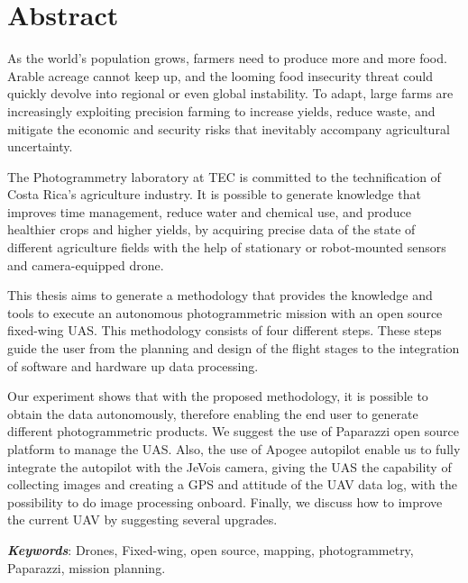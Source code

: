 \section*{Abstract}
As the world’s population grows, farmers need to produce more and more food. Arable acreage cannot keep up, and the looming food insecurity threat could quickly devolve into regional or even global instability. To adapt, large farms are increasingly exploiting precision farming to increase yields, reduce waste, and mitigate the economic and security risks that inevitably accompany agricultural uncertainty.

The  Photogrammetry laboratory at TEC is committed to the technification of  Costa Rica's agriculture industry. It is possible to generate knowledge that improves time management, reduce water and chemical use, and produce healthier crops and higher yields, by acquiring precise data of the state of different agriculture fields with the help of stationary or robot-mounted sensors and camera-equipped drone.


This thesis aims to generate a methodology that provides the knowledge and tools to execute an autonomous photogrammetric mission with an open source fixed-wing UAS.  This methodology consists of four different steps. These steps guide the user from the planning and design of the flight stages to the integration of software and hardware up data processing.

Our experiment shows that with the proposed methodology, it is possible to obtain the data autonomously, therefore enabling the end user to generate different photogrammetric products. We suggest the use of Paparazzi open source platform to manage the UAS. Also, the use of  Apogee autopilot enable us to fully integrate the autopilot with the JeVois camera, giving the UAS the capability of collecting images and creating a GPS and attitude of the UAV data log, with the possibility to do image processing onboard.
Finally, we discuss how to improve the current UAV by suggesting several upgrades.

\textbf{\textit{Keywords}}: Drones, Fixed-wing, open source, mapping, photogrammetry, Paparazzi, mission planning.